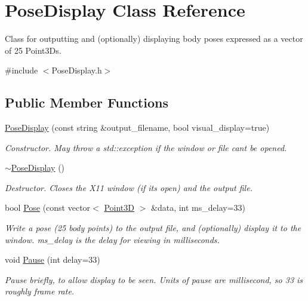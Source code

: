 \hypertarget{classPoseDisplay}{}\section{Pose\+Display Class Reference}
\label{classPoseDisplay}


Class for outputting and (optionally) displaying body poses expressed as a vector of 25 Point3\+Ds.  




{\ttfamily \#include $<$Pose\+Display.\+h$>$}

\subsection*{Public Member Functions}
\begin{DoxyCompactItemize}
\item 
\hyperlink{classPoseDisplay_aa1b69b1d84ef195caccbc763d1028c60}{Pose\+Display} (const string \&output\+\_\+filename, bool visual\+\_\+display=true)
\begin{DoxyCompactList}\small\item\em Constructor. May throw a std\+::exception if the window or file can\textquotesingle{}t be opened. \end{DoxyCompactList}\item 
\hypertarget{classPoseDisplay_abe76af64858d725b705855056facbf3f}{}\hyperlink{classPoseDisplay_abe76af64858d725b705855056facbf3f}{$\sim$\+Pose\+Display} ()\label{classPoseDisplay_abe76af64858d725b705855056facbf3f}

\begin{DoxyCompactList}\small\item\em Destructor. Closes the X11 window (if its open) and the output file. \end{DoxyCompactList}\item 
\hypertarget{classPoseDisplay_a40edcdb672d0f785c4966021d6a2c9e2}{}bool \hyperlink{classPoseDisplay_a40edcdb672d0f785c4966021d6a2c9e2}{Pose} (const vector$<$ \hyperlink{classPoint3D}{Point3\+D} $>$ \&data, int ms\+\_\+delay=33)\label{classPoseDisplay_a40edcdb672d0f785c4966021d6a2c9e2}

\begin{DoxyCompactList}\small\item\em Write a pose (25 body points) to the output file, and (optionally) display it to the window. ms\+\_\+delay is the delay for viewing in milliseconds. \end{DoxyCompactList}\item 
\hypertarget{classPoseDisplay_a7dfe55ebb0ea62ba9f6852e2e61ec3d3}{}void \hyperlink{classPoseDisplay_a7dfe55ebb0ea62ba9f6852e2e61ec3d3}{Pause} (int delay=33)\label{classPoseDisplay_a7dfe55ebb0ea62ba9f6852e2e61ec3d3}

\begin{DoxyCompactList}\small\item\em Pause briefly, to allow display to be seen. Units of pause are millisecond, so 33 is roughly frame rate. \end{DoxyCompactList}\end{DoxyCompactItemize}

